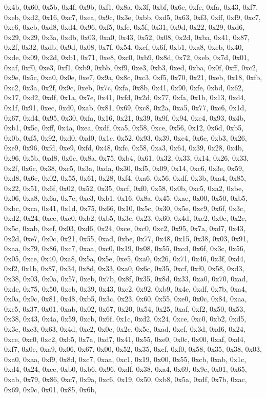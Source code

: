 \documentclass[
]{book}
\begin{document}
0x4b, 0x60, 0x5b, 0x4f, 0x9b, 0xf1, 0x8a, 0x3f, 0xbf, 0x6e, 0xfe, 0xfa, 0x43, 0xf7, 0xeb, 0xd2, 0x16, 0xc7, 0xea, 0x9c, 0x3e, 0xbb, 0xd5, 0x63, 0xf3, 0xff, 0xf9, 0xc7, 0xe6, 0xcb, 0xd8, 0xd4, 0x96, 0xf5, 0xfe, 0x5f, 0x31, 0x9d, 0x22, 0x29, 0xd6, 0x29, 0x29, 0x3a, 0xdb, 0x03, 0xa0, 0x43, 0x52, 0x08, 0x2d, 0xba, 0x41, 0x87, 0x2f, 0x32, 0xdb, 0x9d, 0x08, 0x7f, 0x54, 0xcf, 0x6f, 0xb1, 0xa8, 0xeb, 0x40, 0xde, 0x09, 0x2d, 0xb1, 0x71, 0xe8, 0xc0, 0xb9, 0x8d, 0x72, 0xeb, 0x7d, 0x01, 0xaf, 0xf0, 0xe3, 0xf1,
0xb9, 0xbb, 0xf9, 0xe3, 0xb3, 0xed, 0xba, 0x0f, 0xff, 0xc2, 0x9e, 0x5c, 0xa0, 0x0e, 0xe7, 0x9a, 0x8c, 0xc3, 0xf5, 0x70, 0x21, 0xeb, 0x18, 0xfb, 0xc2, 0x3a, 0x2f, 0x9c, 0xeb, 0x7c, 0xfa, 0x8b, 0x41, 0x90, 0xfe, 0xbd, 0x62, 0x17, 0xd2, 0xdf, 0x1a, 0x7e, 0x41, 0xfd, 0x2d, 0x77, 0xfa, 0x1b, 0x13, 0xd4, 0x1f, 0x91, 0xec, 0xd0, 0xab, 0x81, 0x69, 0xc8, 0x2a, 0xa5, 0x77, 0xc6, 0x1d, 0x67, 0xd4, 0x95, 0x30, 0xfa, 0x16, 0x21, 0x39, 0x9f, 0x94, 0xe4, 0x93, 0x4b, 0xb1, 0x5c, 0xff, 0x4a, 0xea, 0xdf, 0xa5, 0x58,
0xce, 0x56, 0x12, 0x6d, 0xb5, 0x0b, 0xf5, 0x92, 0xd0, 0xd0, 0x1c, 0x52, 0x93, 0x39, 0xe4, 0x6e, 0xb3, 0x26, 0xe9, 0x96, 0xfd, 0xe9, 0xfd, 0x48, 0xfc, 0x58, 0xa3, 0x64, 0x39, 0x28, 0x4b, 0x96, 0x5b, 0xd8, 0x6c, 0x8a, 0x75, 0xb4, 0x61, 0x32, 0x33, 0x14, 0x26, 0x33, 0x2f, 0x6c, 0x38, 0xc5, 0x3a, 0xda, 0x30, 0xf5, 0x09, 0x14, 0xc6, 0x3e, 0x59, 0xd8, 0x6e, 0x02, 0x55, 0x61, 0x28, 0xf4, 0xa6, 0x56, 0xdf, 0x3b, 0xa4, 0x85, 0x22, 0x51, 0x6f, 0x02, 0x52, 0x35, 0xcf, 0xf0, 0x58, 0x0b, 0xc5, 0xa2, 0xbe, 0x06,
0xa8, 0x6a, 0x7e, 0xe3, 0xb1, 0x16, 0x8a, 0x45, 0xae, 0x00, 0x50, 0xb5, 0xbc, 0xca, 0x41, 0x1d, 0x75, 0x66, 0x10, 0x5c, 0x30, 0x5e, 0xc9, 0x6f, 0x3c, 0xd2, 0x24, 0xce, 0xc0, 0xb2, 0xb5, 0x3c, 0x23, 0x60, 0x4d, 0xe2, 0x0c, 0x2c, 0x5c, 0xab, 0xef, 0x03, 0xd6, 0x24, 0xce, 0xc0, 0xc2, 0x95, 0x7a, 0xd7, 0x43, 0x2d, 0xe7, 0x0c, 0x21, 0x55, 0xad, 0xbe, 0x77, 0x48, 0x15, 0x38, 0x03, 0x91, 0xaa, 0x79, 0x86, 0xc7, 0xaa, 0xc0, 0x19, 0x08, 0x55, 0xcd, 0x6f, 0x3c, 0x56, 0x05, 0xce, 0x40, 0xa8, 0x5a, 0x5e, 0xe5,
0xa0, 0x26, 0x71, 0x46, 0x3f, 0xd4, 0xf2, 0x1b, 0x87, 0x34, 0x8d, 0x33, 0xa0, 0x6c, 0x35, 0xcf, 0xf0, 0x58, 0xd3, 0x38, 0x03, 0x0a, 0x57, 0xeb, 0x7b, 0x8f, 0x35, 0x8d, 0x33, 0xa0, 0x70, 0xad, 0xde, 0x75, 0x50, 0xcb, 0x39, 0x43, 0xc2, 0x92, 0xb9, 0x4e, 0xdf, 0x7b, 0xa4, 0x0a, 0x9c, 0x81, 0x48, 0xb5, 0x3c, 0x23, 0x60, 0x55, 0xe0, 0x0c, 0x84, 0xaa, 0xe5, 0x37, 0x01, 0xab, 0x02, 0x67, 0x20, 0x54, 0x25, 0xaf, 0xf2, 0x50, 0x53, 0x38, 0x43, 0x4a, 0x59, 0xcb, 0x6f, 0x1c, 0xd2, 0x24, 0xce, 0xc0, 0xb2, 0xd5,
0x3c, 0xc3, 0x63, 0x4d, 0xe2, 0x0c, 0x2c, 0x5c, 0xad, 0xef, 0x3d, 0xd6, 0x24, 0xce, 0xc0, 0xc2, 0xb5, 0x7a, 0xd7, 0x41, 0x55, 0xe0, 0x0c, 0x00, 0xaf, 0xd4, 0xf7, 0x0e, 0xa9, 0x06, 0x67, 0x00, 0x52, 0x35, 0xcf, 0xf0, 0x58, 0x35, 0x38, 0x03, 0xa0, 0xaa, 0xf9, 0x8d, 0xc7, 0xaa, 0xc1, 0x19, 0x00, 0x55, 0xcb, 0xab, 0x1c, 0xd4, 0x24, 0xce, 0xb0, 0xb6, 0x96, 0xdf, 0x38, 0xa4, 0x69, 0x9c, 0x01, 0x65, 0xab, 0x79, 0x86, 0xc7, 0x9a, 0xc6, 0x19, 0x50, 0xb8, 0x5a, 0xdf, 0x7b, 0xac, 0x69, 0x9c, 0x01, 0x85, 0x6b,
\end{document}
